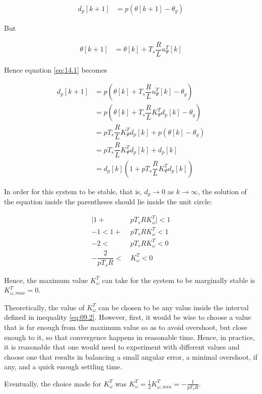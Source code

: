 \begin{align}
  d_p[k+1] &= p (\theta[k+1] - \theta_g) \label{eq:14.1}
\end{align}

But

\begin{align*}
  \theta[k+1] &= \theta[k] + T_s \dfrac{R}{L} u_{\Psi}^T[k]
\end{align*}

Hence equation \ref{eq:14.1} becomes

\begin{align*}
  d_p[k+1] &= p (\theta[k] + T_s \dfrac{R}{L} u_{\Psi}^T[k] - \theta_g) \\
           &= p(\theta[k] + T_s \dfrac{R}{L} K_{\Psi}^T d_p[k] - \theta_g)  \\
           &= p T_s \dfrac{R}{L} K_{\Psi}^T d_p[k] + p (\theta[k] - \theta_g) \\
           &= p T_s \dfrac{R}{L} K_{\Psi}^T d_p[k] + d_p[k] \\
           &= d_p[k] (1 + p T_s \dfrac{R}{L} K_{\Psi}^T d_p[k])
\end{align*}

In order for this system to be stable, that is, $d_p \to 0$ as $k \to \infty$,
the solution of the equation inside the parentheses should lie inside the unit
circle:

\begin{align}
  \Big|1 + &p T_s R K_{\omega}^T\Big| < 1 \nonumber \\
  -1 < 1 + &p T_s R K_{\omega}^T < 1 \nonumber \\
  -2 < &p T_s R K_{\omega}^T < 0 \nonumber \\
  -\dfrac{2}{p T_s R} <\ &K_{\omega}^T < 0 \label{eq:14.2}
\end{align}

Hence, the maximum value $K_{\omega}^T$ can take for the system to be marginally
stable is $K_{\omega,max}^T = 0$.

Theoretically, the value of $K_{\omega}^T$ can be chosen to be any value inside
the interval defined in inequality \ref{eq:09.2}. However, first, it would be
wise to choose a value that is far enough from the maximum value so as to avoid
overshoot, but close enough to it, so that convergence happens in reasonable
time. Hence, in practice, it is reasonable that one would need to experiment
with different values and choose one that results in balancing a small angular
error, a minimal overshoot, if any, and a quick enough settling time.

Eventually, the choice made for $K_{\omega}^T$ was
$K_{\omega}^T = \frac{1}{2} K_{\omega,min}^T = -\frac{1}{p T_s R}$.
